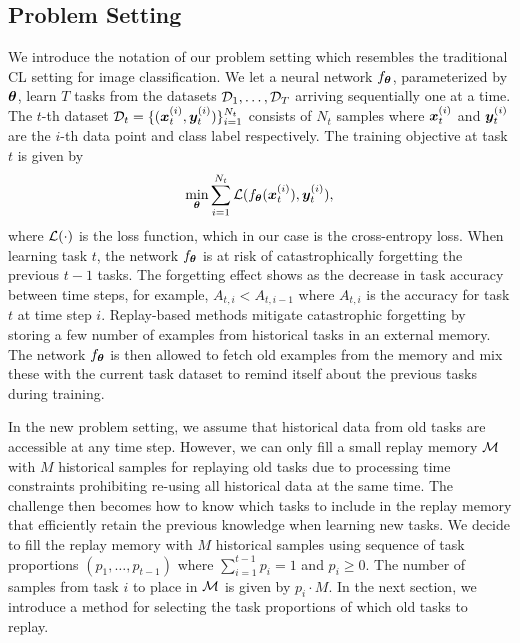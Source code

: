 \subsection{Problem Setting}

We introduce the notation of our problem setting which resembles the traditional CL setting for image classification. We let a neural network $f_{{\bm{\theta}}}$, parameterized by ${\bm{\theta}}$, learn $T$ tasks from the datasets ${\mathcal{D}}_1, \dots, {\mathcal{D}}_T$ arriving sequentially one at a time. The $t$-th dataset ${\mathcal{D}}_t = \{({\bm{x}}_{t}^{(i)}, {\bm{y}}_{t}^{(i)})\}_{i=1}^{N_{t}}$ consists of $N_t$ samples where ${\bm{x}}_{t}^{(i)}$ and ${\bm{y}}_{t}^{(i)}$ are the $i$-th data point and class label respectively. The training objective at task $t$ is given by 
\vspace{-2mm}
\begin{align}
	\underset{{\bm{\theta}}}{\text{min}} \sum_{i=1}^{N_t} {\mathcal{L}}(f_{{\bm{\theta}}}({\bm{x}}_t^{(i)}), {\bm{y}}_{t}^{(i)}),
\end{align}
where ${\mathcal{L}}(\cdot)$ is the loss function, which in our case is the cross-entropy loss.  
When learning task $t$, the network $f_{{\bm{\theta}}}$ is at risk of catastrophically forgetting the previous $t-1$ tasks. The forgetting effect shows as the decrease in task accuracy between time steps, for example, $A_{t, i} < A_{t, i-1}$ where $A_{t, i}$ is the accuracy for task $t$ at time step $i$. Replay-based methods mitigate catastrophic forgetting by storing a few number of examples from historical tasks in an external memory. The network $f_{{\bm{\theta}}}$ is then allowed to fetch old examples from the memory and mix these with the current task dataset to remind itself about the previous tasks during training. 

In the new problem setting, we assume that historical data from old tasks are accessible at any time step. However, we can only fill a small replay memory ${\mathcal{M}}$ with $M$ historical samples for replaying old tasks due to processing time constraints prohibiting re-using all historical data at the same time. The challenge then becomes how to know which tasks to include in the replay memory that efficiently retain the previous knowledge when learning new tasks. We decide to fill the replay memory with $M$ historical samples using sequence of task proportions $(p_1, \dots, p_{t-1})$ where $\sum_{i=1}^{t-1} p_i = 1$ and $p_{i} \geq 0$. The number of samples from task $i$ to place in ${\mathcal{M}}$ is given by $p_i \cdot M$. In the next section, we introduce a method for selecting the task proportions of which old tasks to replay. 


